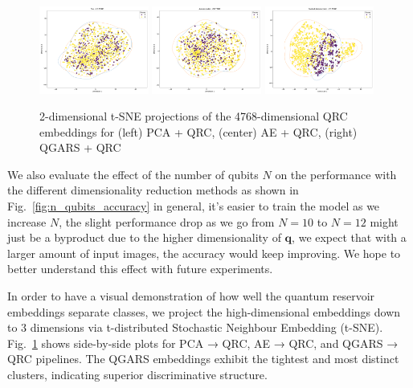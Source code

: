 \documentclass[conference]{IEEEtran}
\begin{document}
\begin{figure}[!ht]
  \centering
  \includegraphics[width=0.32\textwidth]{images/results/generated_polyp_dataset/quantum_embeddings_2d_tsne_PCA.pdf}
  \includegraphics[width=0.32\textwidth]{images/results/generated_polyp_dataset/quantum_embeddings_2d_tsne_autoencoder.pdf}
  \includegraphics[width=0.32\textwidth]{images/results/generated_polyp_dataset/quantum_embeddings_2d_tsne_guided_autoencoder.pdf}
  \caption{2-dimensional t-SNE projections of the 4768-dimensional QRC embeddings for (left) PCA + QRC, (center) AE + QRC, (right) QGARS + QRC}
  \label{fig:embeddings_tsne}
\end{figure}

We also evaluate the effect of the number of qubits $N$ on the performance with the different dimensionality reduction methods as shown in Fig.~\ref{fig:n_qubits_accuracy} in general, it's easier to train the model as we increase $N$, the slight performance drop as we go from $N = 10$ to $N = 12$ might just be a byproduct due to the higher dimensionality of $\bm q$, we expect that with a larger amount of input images, the accuracy would keep improving. We hope to better understand this effect with future experiments.



In order to have a visual demonstration of how well the quantum reservoir embeddings separate classes, we project the high-dimensional embeddings down to $3$ dimensions via t-distributed Stochastic Neighbour Embedding (t-SNE). Fig.~\ref{fig:embeddings_tsne} shows side-by-side plots for PCA → QRC, AE → QRC, and QGARS → QRC pipelines. The QGARS embeddings exhibit the tightest and most distinct clusters, indicating superior discriminative structure.
\end{document}
